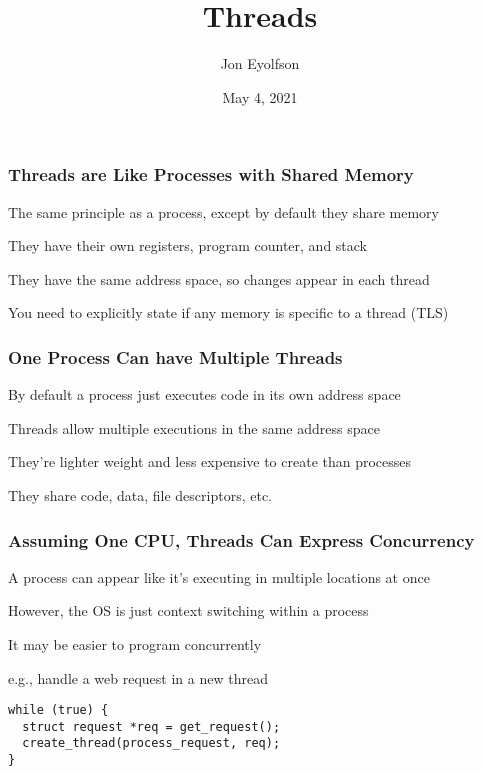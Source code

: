 

\title{Threads}
\author{Jon Eyolfson}
\date{May 4, 2021}


  \begin{frame}
    \titlepage
  \end{frame}

  \begin{frame}
    \frametitle{Threads are Like Processes with Shared Memory}

    The same principle as a process, except by default they share memory

    \hspace{2em} They have their own registers, program counter, and stack

    \vspace{2em}

    They have the same address space, so changes appear in each thread

    \vspace{2em}

    You need to explicitly state if any memory is specific to a thread (TLS)
  \end{frame}

  \begin{frame}
    \frametitle{One Process Can have Multiple Threads}

    By default a process just executes code in its own address space

    \vspace{2em}

    Threads allow multiple executions in the same address space

    \vspace{2em}

    They're lighter weight and less expensive to create than processes

    \hspace{2em} They share code, data, file descriptors, etc.
  \end{frame}

  \begin{frame}[fragile]
    \frametitle{Assuming One CPU, Threads Can Express Concurrency}

    A process can appear like it's executing in multiple locations at once

    \hspace{2em} However, the OS is just context switching within a process

    \vspace{2em}

    It may be easier to program concurrently

    \hspace{2em} e.g., handle a web request in a new thread

    \vspace{2em}

    \begin{lstlisting}
while (true) {
  struct request *req = get_request();
  create_thread(process_request, req);
}
    \end{lstlisting}
  \end{frame}

